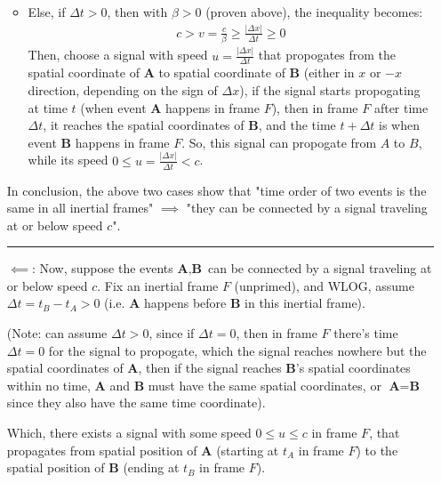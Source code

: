 \documentclass{article}
\newcommand{\bA}{\textbf{A}}
\newcommand{\bB}{\textbf{B}}
\begin{document}
\begin{itemize}
\begin{itemize}
        \item Else, if $\Delta t>0$, then with $\beta >0$ (proven above), the inequality becomes:
        \begin{align}
            c> v = \frac{c}{\beta}\geq \frac{|\Delta x|}{\Delta t} \geq 0
        \end{align}
        Then, choose a signal with speed $u = \frac{|\Delta x|}{\Delta t}$ that propogates from the spatial coordinate of $\bA$ to spatial coordinate of $\bB$ (either in $x$ or $-x$ direction, depending on the sign of $\Delta x$), if the signal starts propogating at time $t$ (when event $\bA$ happens in frame $F$), then in frame $F$ after time $\Delta t$, it reaches the spatial coordinates of $\bB$, and the time $t+\Delta t$ is when event $\bB$ happens in frame $F$. So, this signal can propogate from $A$ to $B$, while its speed $0\leq u = \frac{|\Delta x|}{\Delta t}<c$.
    \end{itemize}
    In conclusion, the above two cases show that "time order of two events is the same in all inertial frames" $\implies$ "they can be connected by a signal traveling at or below speed $c$".

    \rule{15.6cm}{0.1mm}

    \item[$\impliedby$:] Now, suppose the events $\bA,\bB$ can be connected by a signal traveling at or below speed $c$. Fix an inertial frame $F$ (unprimed), and WLOG, assume $\Delta t = t_B - t_A > 0$ (i.e. $\bA$ happens before $\bB$ in this inertial frame). 
    
    (Note: can assume $\Delta t>0$, since if $\Delta t = 0$, then in frame $F$ there's time $\Delta t=0$ for the signal to propogate, which the signal reaches nowhere but the spatial coordinates of $\bA$, then if the signal reaches $\bB$'s spatial coordinates within no time, $\bA$ and $\bB$ must have the same spatial coordinates, or $\bA=\bB$ since they also have the same time coordinate).

    Which, there exists a signal with some speed $0\leq u\leq c$ in frame $F$, that propagates from spatial position of $\bA$ (starting at $t_A$ in frame $F$) to the spatial position of $\bB$ (ending at $t_B$ in frame $F$).
    
    \hfil


\end{itemize}
\end{document}
